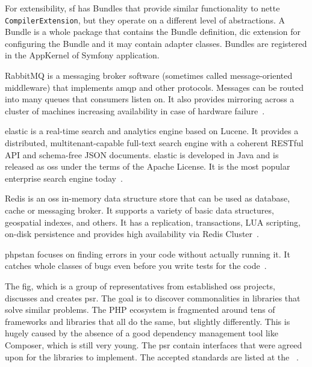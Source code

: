 For extensibility, \gls{sf} has Bundles that provide similar functionality to \gls{nette} \lstinline{CompilerExtension}, but they operate on a different level of abstractions. A Bundle is a whole package that contains the Bundle definition, \gls{dic} extension for configuring the Bundle and it may contain adapter classes. Bundles are registered in the AppKernel of Symfony application.

 \label{sec:theory:rabbitmq}

RabbitMQ is a messaging broker software (sometimes called message-oriented middleware) that implements \gls{amqp} and other protocols. Messages can be routed into many queues that consumers listen on. It also provides mirroring across a cluster of machines increasing availability in case of hardware failure~\cite{rabbitmq:features}.

 \label{sec:theory:elasticsearch}

\gls{elastic} is a real-time search and analytics engine based on Lucene. It provides a distributed, multitenant-capable full-text search engine with a coherent RESTful API and schema-free JSON documents. \gls{elastic} is developed in Java and is released as \gls{oss} under the terms of the Apache License. It is the most popular enterprise search engine today~\cite{gormley2015elasticsearch}.

 \label{sec:theory:redis}

Redis is an \gls{oss} in-memory data structure store that can be used as database, cache or messaging broker. It supports a variety of basic data structures, geospatial indexes, and others. It has a replication, transactions, LUA scripting, on-disk persistence and provides high availability via Redis Cluster~\cite{redis:about}.

 \label{sec:theory:phpstan}

\gls{phpstan} focuses on finding errors in your code without actually running it. It catches whole classes of bugs even before you write tests for the code~\cite{github:phpstan}.

 \label{sec:theory:psr}

The \gls{fig}, which is a group of representatives from established \gls{oss} projects, discusses and creates \gls{psr}. The goal is to discover commonalities in libraries that solve similar problems. The PHP ecosystem is fragmented around tens of frameworks and libraries that all do the same, but slightly differently. This is hugely caused by the absence of a good dependency management tool like Composer, which is still very young. The \gls{psr} contain interfaces that were agreed upon for the libraries to implement. The accepted standards are listed at the ~\cite{fig:psr}.

